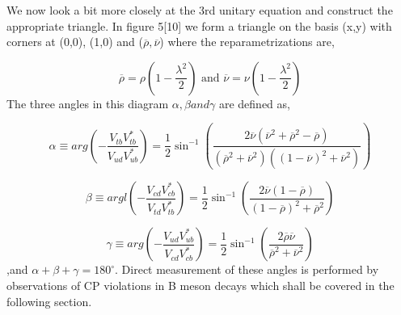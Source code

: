 We now look a bit more closely at the 3rd unitary equation and construct the appropriate triangle. In figure {5}[10] we form a triangle on the basis (x,y) with corners at (0,0), (1,0) and ($\overline{\rho},\overline{\nu}$) where the reparametrizations are,

\[\overline{\rho}=\rho\left(1-\frac{\lambda^2}{2}\right) \mbox{ and } \overline{\nu}=\nu\left(1-\frac{\lambda^2}{2}\right)\]
The three angles in this diagram $\alpha , \beta and \gamma$ are defined as,

\[ \alpha\equiv arg\left(-\frac{V_{tb}V^{*}_{tb}}{V_{ud}V^{*}_{ub}}\right) =\frac{1}{2}\sin^{-1}\left(\frac{2\overline{\nu}(\overline{\nu}^2+\overline{\rho}^2-\overline{\rho})}{(\overline{\rho}^2+\overline{\nu}^2)((1-\overline{\nu})^2+\overline{\nu}^2)}\right) \]

\[\beta\equiv argl\left(-\frac{V_{cd}V^{*}_{cb}}{V_{td}V^{*}_{tb}}\right) = \frac{1}{2}\sin^{-1}\left(\frac{2\overline{\nu}(1-\overline{\rho})}{(1-\overline{\rho})^2+\overline{\rho}^2}\right)\]

\[\gamma\equiv arg\left(-\frac{V_{ud}V^{*}_{ub}}{V_{cd}V^{*}_{cb}}\right) = \frac{1}{2}\sin^{-1}\left(\frac{2\overline{\rho}\overline{\nu}}{\overline{\rho}^2+\overline{\nu}^2}\right)\]
,and $\alpha + \beta + \gamma = 180^{\circ}$. Direct measurement of these angles is performed by observations of CP violations in B meson decays which shall be covered in the following section.


%

